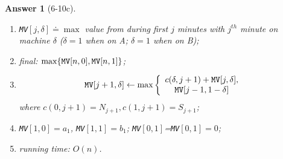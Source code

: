 \documentclass[11pt]{article}
\theoremstyle{numberplain}
\theoremstyle{nonumberplain}
\newtheorem{ans}{Answer}
\newcommand{\0}{{\mathbf{0}}}
\begin{document}
\begin{ans}[6-10c]
\begin{enumerate}
\item {\tt MV}$[j,\delta]\doteq \max$ value from during first $j$ minutes with $j^{th}$ minute on machine $\delta$ ($\delta=1$ when on A; $\delta=1$ when on B);
\item final: $\max\{{\tt MV}[n,0], {\tt MV}[n,1] \}$;
\item $${\tt MV}[j+1,\delta]\leftarrow \max\left\{ 
\begin{array}{c}
c(\delta,j+1)+{\tt MV}[j,\delta],\\
{\tt MV}[j-1,1-\delta]\end{array} \right.$$ where  $c(0,j+1)=N_{j+1},c(1,j+1)=S_{j+1}$;
\item {\tt MV}$[1,0]=a_1$, {\tt MV}$[1,1]=b_1$; {\tt MV}$[0,1]$={\tt MV}$[0,1]=0$;
\item running time: $O(n)$.
\end{enumerate}
\end{ans}
\end{document}
